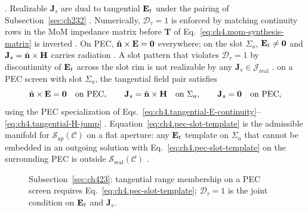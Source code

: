 \cite{stratton1941}. Realizable \(\mathbf{J}_{s}\) are dual to tangential \(\mathbf{E}_{t}\) under the pairing of
Subsection~\ref{sec:ch232} \cite{harrington2001}. Numerically, \(\mathcal{D}_{\tau}=1\) is enforced by matching
continuity rows in the MoM impedance matrix before \(\mathbf{T}\) of Eq.~\eqref{eq:ch4.mom-synthesis-matrix} is
inverted \cite{harrington2001}.
On PEC, \(\hat{\mathbf{n}}\times\mathbf{E}=\mathbf{0}\) everywhere; on the slot \(\Sigma_{a}\), \(\mathbf{E}_{t}\neq\mathbf{0}\) and
\(\mathbf{J}_{s}=\hat{\mathbf{n}}\times\mathbf{H}\) carries radiation \cite{stratton1941}. A slot pattern that
violates \(\mathcal{D}_{\tau}=1\) by discontinuity of \(\mathbf{E}_{t}\) across the slot rim is not realizable by any
\(\mathbf{J}_{s}\in\mathcal{J}_{\mathrm{real}}\) \cite{harrington2001}.
on a PEC screen with slot \(\Sigma_{a}\), the tangential field pair satisfies
\begin{equation}
\label{eq:ch4.pec-slot-template}
\hat{\mathbf{n}}\times\mathbf{E}
=
\mathbf{0}
\quad\text{on PEC},
\qquad
\mathbf{J}_{s}
=
\hat{\mathbf{n}}\times\mathbf{H}
\quad\text{on }\Sigma_{a},
\qquad
\mathbf{J}_{s}=\mathbf{0}
\quad\text{on PEC},
\end{equation}
using the PEC specialization of Eqs.~\eqref{eq:ch4.tangential-E-continuity}--\eqref{eq:ch4.tangential-H-jump}
\cite{stratton1941}. Equation~\eqref{eq:ch4.pec-slot-template} is the admissible manifold for
\(\mathcal{S}_{\mathrm{ap}}(\mathcal{C})\) on a flat aperture: any \(\mathbf{E}_{t}\) template on \(\Sigma_{a}\) that cannot be
embedded in an outgoing solution with Eq.~\eqref{eq:ch4.pec-slot-template} on the surrounding PEC is outside
\(\mathcal{S}_{\mathrm{real}}(\mathcal{C})\) \cite{harrington2001}.
\begin{figure}[t]
\centering
{}
\caption{Subsection~\ref{sec:ch423}: tangential range membership on a PEC screen requires
Eq.~\eqref{eq:ch4.pec-slot-template}; \(\mathcal{D}_{\tau}=1\) is the joint condition on \(\mathbf{E}_{t}\) and
\(\mathbf{J}_{s}\).}
\label{fig:ch4.pec-slot-tangential}
\end{figure}
